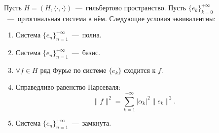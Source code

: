 \begin{theorem}
    Пусть $H = (H, \langle \cdot, \cdot \rangle)$~---~гильбертово пространство.
    Пусть $\{e_k\}_{k = 0}^{+\infty}$~---~ортогональная система в нём.
    Следующие условия эквивалентны:
    \begin{enumerate}
        \item Система $\{e_n\}_{n = 1}^{+\infty}$~---~полна.
        \item Система $\{e_n\}_{n = 1}^{+\infty}$~---~базис.
        \item $\forall f \in H$ ряд Фурье по системе $\{e_k\}$ сходится к $f$.
        \item Справедливо равенство Парсеваля:
        \[
            \|f\|^2 = \sum\limits_{k = 1}^{+\infty} |\alpha_k|^2 \|e_k\|^2.
        \]
        \item Система $\{e_n\}_{n = 1}^{+\infty}$~---~замкнута.
    \end{enumerate}
\end{theorem}
